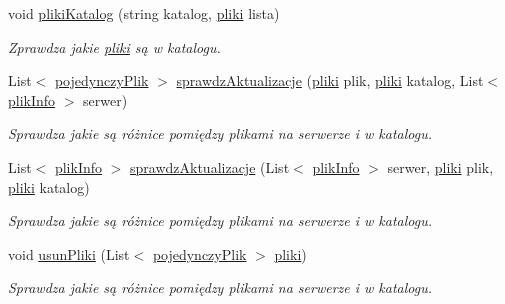 \begin{CompactItemize}
void \hyperlink{a00037_0eb71b522a777a8dba01615aa58b2203}{plikiKatalog} (string katalog, \hyperlink{a00017}{pliki} lista)
\begin{CompactList}\small\item\em Zprawdza jakie \hyperlink{a00017}{pliki} są w katalogu. \item\end{CompactList}\item 
List$<$ \hyperlink{a00020}{pojedynczyPlik} $>$ \hyperlink{a00037_929f999868b8425b4b6ae6a835187e22}{sprawdzAktualizacje} (\hyperlink{a00017}{pliki} plik, \hyperlink{a00017}{pliki} katalog, List$<$ \hyperlink{a00018}{plikInfo} $>$ serwer)
\begin{CompactList}\small\item\em Sprawdza jakie są różnice pomiędzy plikami na serwerze i w katalogu. \item\end{CompactList}\item 
List$<$ \hyperlink{a00018}{plikInfo} $>$ \hyperlink{a00037_605e903992f33680e874e6685760786a}{sprawdzAktualizacje} (List$<$ \hyperlink{a00018}{plikInfo} $>$ serwer, \hyperlink{a00017}{pliki} plik, \hyperlink{a00017}{pliki} katalog)
\begin{CompactList}\small\item\em Sprawdza jakie są różnice pomiędzy plikami na serwerze i w katalogu. \item\end{CompactList}\item 
void \hyperlink{a00037_8c6fafc63cea03167c3cac60d6ebf3a3}{usunPliki} (List$<$ \hyperlink{a00020}{pojedynczyPlik} $>$ \hyperlink{a00017}{pliki})
\begin{CompactList}\small\item\em Sprawdza jakie są różnice pomiędzy plikami na serwerze i w katalogu. \item\end{CompactList}\end{CompactItemize}
